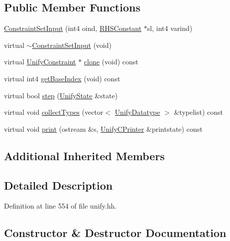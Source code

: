 \subsection*{Public Member Functions}
\begin{DoxyCompactItemize}
\item 
\mbox{\hyperlink{class_constraint_set_input_ac292c6084e63ffcc02cfea98c59cb9b9}{Constraint\+Set\+Input}} (int4 oind, \mbox{\hyperlink{class_r_h_s_constant}{R\+H\+S\+Constant}} $\ast$sl, int4 varind)
\item 
virtual \mbox{\hyperlink{class_constraint_set_input_ac5bd23615e88373c91bb729c2ac80357}{$\sim$\+Constraint\+Set\+Input}} (void)
\item 
virtual \mbox{\hyperlink{class_unify_constraint}{Unify\+Constraint}} $\ast$ \mbox{\hyperlink{class_constraint_set_input_a354bb6ff80135e817248e1da6c14731f}{clone}} (void) const
\item 
virtual int4 \mbox{\hyperlink{class_constraint_set_input_af83fc0a5dbaa89f9612245241c05d0c8}{get\+Base\+Index}} (void) const
\item 
virtual bool \mbox{\hyperlink{class_constraint_set_input_afe2320ca9a36a19fec3bcfaa7130c0ca}{step}} (\mbox{\hyperlink{class_unify_state}{Unify\+State}} \&state)
\item 
virtual void \mbox{\hyperlink{class_constraint_set_input_aa1a4f5a68db4e16baf4a84a76c6c4540}{collect\+Types}} (vector$<$ \mbox{\hyperlink{class_unify_datatype}{Unify\+Datatype}} $>$ \&typelist) const
\item 
virtual void \mbox{\hyperlink{class_constraint_set_input_a7f3aa6e111956cbbb1f5c1e0c42c5068}{print}} (ostream \&s, \mbox{\hyperlink{class_unify_c_printer}{Unify\+C\+Printer}} \&printstate) const
\end{DoxyCompactItemize}
\subsection*{Additional Inherited Members}


\subsection{Detailed Description}


Definition at line 554 of file unify.\+hh.



\subsection{Constructor \& Destructor Documentation}
\mbox{\label{class_constraint_set_input_ac292c6084e63ffcc02cfea98c59cb9b9}} 
